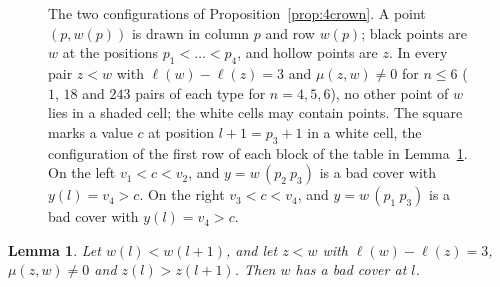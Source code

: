 \documentclass[11pt]{amsart}
\newtheorem{lemma}[theorem]{Lemma}
\theoremstyle{definition}
\theoremstyle{remark}
\begin{document}
\begin{figure}[ht]
\caption{The two configurations of Proposition~\ref{prop:4crown}. A point $(p,w(p))$ is drawn in column $p$ and row $w(p)$; black points are $w$ at the positions $p_1<\dots<p_4$, and hollow points are $z$. In every pair $z<w$ with $\ell(w)-\ell(z)=3$ and $\mu(z,w)\ne0$ for $n\le6$ ($1$, $18$ and $243$ pairs of each type for $n=4,5,6$), no other point of $w$ lies in a shaded cell; the white cells may contain points. The square marks a value $c$ at position $l+1=p_3+1$ in a white cell, the configuration of the first row of each block of the table in Lemma~\ref{lem:nolongmu}. On the left $v_1<c<v_2$, and $y=w\,(p_2\ p_3)$ is a bad cover with $y(l)=v_4>c$. On the right $v_3<c<v_4$, and $y=w\,(p_1\ p_3)$ is a bad cover with $y(l)=v_4>c$.}\label{fig:config}
\end{figure}

\begin{lemma}\label{lem:nolongmu}
Let $w(l)<w(l+1)$, and let $z<w$ with $\ell(w)-\ell(z)=3$, $\mu(z,w)\ne0$ and $z(l)>z(l+1)$. Then $w$ has a bad cover at $l$.
\end{lemma}
\end{document}
